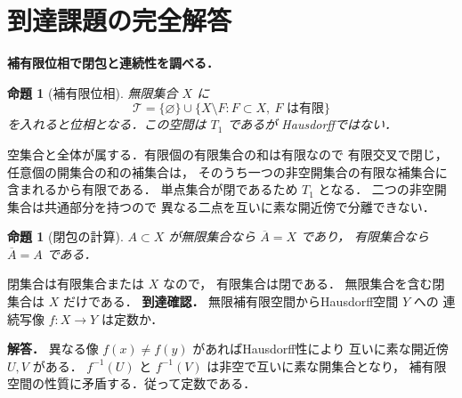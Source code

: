 \documentclass[a5paper,10pt,onecolumn]{jsarticle}
\makeatletter
\theoremstyle{mathnotetheorem}
\newtheorem{proposition}[theorem]{命題}
\renewcommand{\proofname}{証明}
\renewenvironment{proof}[1][\proofname]{%
  \par\pushQED{\qed}\normalfont\topsep4\p@\@plus2\p@\relax
  \trivlist\item[\hskip\labelsep\bfseries #1]\ignorespaces
}{\popQED\endtrivlist\@endpefalse}
\makeatother
\begin{document}
\section{到達課題の完全解答}
\noindent\textbf{補有限位相で閉包と連続性を調べる．}
\begin{proposition}[補有限位相]
無限集合 $X$ に
\[
\mathcal T=\{\varnothing\}\cup
\{X\setminus F:F\subset X,\ F\text{ は有限}\}
\]
を入れると位相となる．この空間は $T_1$ であるが
Hausdorffではない．
\end{proposition}
\begin{proof}
空集合と全体が属する．有限個の有限集合の和は有限なので
有限交叉で閉じ，任意個の開集合の和の補集合は，
そのうち一つの非空開集合の有限な補集合に含まれるから有限である．
単点集合が閉であるため $T_1$ となる．
二つの非空開集合は共通部分を持つので
異なる二点を互いに素な開近傍で分離できない．
\end{proof}
\begin{proposition}[閉包の計算]
$A\subset X$ が無限集合なら $\overline A=X$ であり，
有限集合なら $\overline A=A$ である．
\end{proposition}
\begin{proof}
閉集合は有限集合または $X$ なので，
有限集合は閉である．
無限集合を含む閉集合は $X$ だけである．
\end{proof}
\noindent\textbf{到達確認．}
無限補有限空間からHausdorff空間 $Y$ への
連続写像 $f:X\to Y$ は定数か．
\par\noindent\textbf{解答．}
異なる像 $f(x)\ne f(y)$ があればHausdorff性により
互いに素な開近傍 $U,V$ がある．
$f^{-1}(U)$ と $f^{-1}(V)$ は非空で互いに素な開集合となり，
補有限空間の性質に矛盾する．従って定数である．
\end{document}
